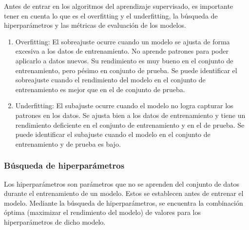 \documentclass[a4paper, 12pt]{book}
\begin{document}
Antes de entrar en los algoritmos del aprendizaje supervisado, es importante tener en cuenta lo que es el overfitting y el underfitting, la búsqueda de hiperparámetros y las métricas de evaluación de los modelos.
\begin{enumerate}
	\item Overfitting: El sobreajuste ocurre cuando un modelo se ajusta de forma excesiva a los datos de entrenamiento. No aprende patrones para poder aplicarlo a datos nuevos. Su rendimiento es muy bueno en el conjunto de entrenamiento, pero pésimo en conjunto de prueba. Se puede identificar el sobreajuste cuando el rendimiento del modelo en el conjunto de entrenamiento es mejor que en el de conjunto de prueba.
	\item Underfitting: El subajuste ocurre cuando el modelo no logra capturar los patrones en los datos. Se ajusta bien a los datos de entrenamiento y tiene un rendimiento deficiente en el conjunto de entrenamiento y en el de prueba. Se puede identificar el subajuste cuando el modelo en el conjunto de entrenamiento y de prueba es bajo.
\end{enumerate}

\subsubsection{Búsqueda de hiperparámetros}
Los hiperparámetros son parámetros que no se aprenden del conjunto de datos durante el entrenamiento de un modelo. Estos se establecen antes de entrenar el modelo. Mediante la búsqueda de hiperparámetros, se encuentra la combinación óptima (maximizar el rendimiento del modelo) de valores para los hiperparámetros de dicho modelo.
\end{document}
